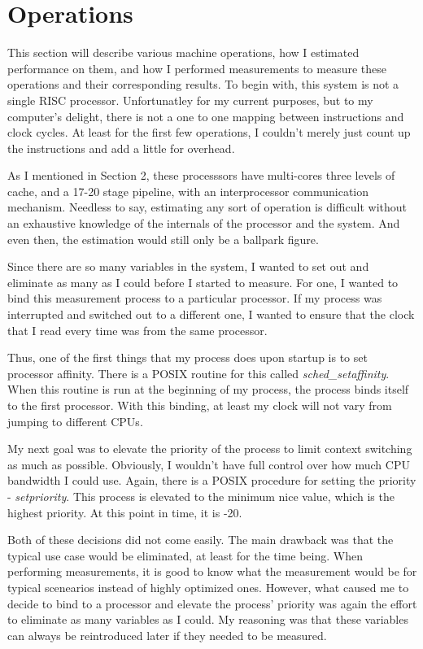 \documentclass[paper=a4, fontsize=11pt]{scrartcl}
\numberwithin{equation}{section}        %
\numberwithin{figure}{section}          %
\numberwithin{table}{section}               %
\begin{document}
\section{Operations}

This section will describe various machine operations, how I estimated performance on them, and how I performed measurements to measure these operations and their corresponding results.  To begin with, this system is not a single RISC processor.  Unfortunatley for my current purposes, but to my computer's delight, there is not a one to one mapping between instructions and clock cycles.  At least for the first few operations, I couldn't merely just count up the instructions and add a little for overhead.

As I mentioned in Section 2, these processsors have multi-cores three levels of cache, and a 17-20 stage pipeline, with an interprocessor communication mechanism.  Needless to say, estimating any sort of operation is difficult without an exhaustive knowledge of the internals of the processor and the system.  And even then, the estimation would still only be a ballpark figure.

Since there are so many variables in the system, I wanted to set out and eliminate as many as I could before I started to measure.  For one, I wanted to bind this measurement process to a particular processor.  If my process was interrupted and switched out to a different one, I wanted to ensure that the clock that I read every time was from the same processor.

Thus, one of the first things that my process does upon startup is to set processor affinity.  There is a POSIX routine for this called \textit{sched\_setaffinity}.  When this routine is run at the beginning of my process, the process binds itself to the first processor.  With this binding, at least my clock will not vary from jumping to different CPUs.

My next goal was to elevate the priority of the process to limit context switching as much as possible.  Obviously, I wouldn't have full control over how much CPU bandwidth I could use.  Again, there is a POSIX procedure for setting the priority - \textit{setpriority}.  This process is elevated to the minimum nice value, which is the highest priority.  At this point in time, it is -20.

Both of these decisions did not come easily.  The main drawback was that the typical use case would be eliminated, at least for the time being.  When performing measurements, it is good to know what the measurement would be for typical scenearios instead of highly optimized ones.  However, what caused me to decide to bind to a processor and elevate the process' priority was again the effort to eliminate as many variables as I could.  My reasoning was that these variables can always be reintroduced later if they needed to be measured.
\end{document}
